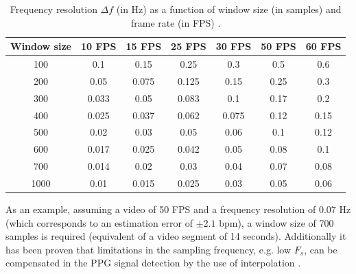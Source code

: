 \begin{table}[h!]
\caption{Frequency resolution $\Delta f$ (in Hz) as a function of window size (in samples) and frame rate (in FPS) \parencite{roald2013estimation}.}
\label{table:frequency-resolution}
\centering
\begin{tabular}{ccccccc}%
\toprule%
Window size & 10 FPS & 15 FPS & 25 FPS & 30 FPS & 50 FPS & 60 FPS \\
\midrule
100 & 0.1 & 0.15 & 0.25 & 0.3 & 0.5 & 0.6 \\
200 & 0.05 & 0.075 & 0.125 & 0.15 & 0.25 & 0.3 \\
300 & 0.033 & 0.05 & 0.083 & 0.1 & 0.17 & 0.2 \\
400 & 0.025 & 0.037 & 0.062 & 0.075 & 0.12 & 0.15 \\
500 & 0.02 & 0.03 & 0.05 & 0.06 & 0.1 & 0.12 \\
600 & 0.017 & 0.025 & 0.042 & 0.05 & 0.08 & 0.1 \\
700 & 0.014 & 0.02 & 0.03 & 0.04 & 0.07 & 0.08 \\
1000 & 0.01 & 0.015 & 0.025 & 0.03 & 0.05 & 0.06 \\
\bottomrule%
\end{tabular}%
\end{table}

As an example, assuming a video of 50 FPS and a frequency resolution of 0.07 Hz (which corresponds to an estimation error of $\pm 2.1$ bpm), a window size of 700 samples is required (equivalent of a video segment of 14 seconds). Additionally it has been proven that limitations in the sampling frequency, e.g. low $F_s$, can be compensated in the PPG signal detection by the use of interpolation \parencite{sun2012noncontact}.
